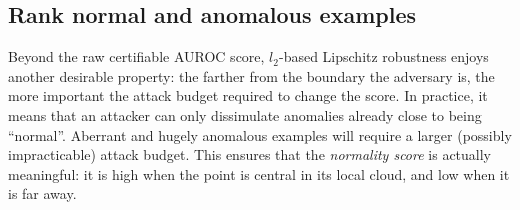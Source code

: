 \subsection{Rank normal and anomalous examples}
  
Beyond the raw certifiable AUROC score, $l_2$-based Lipschitz robustness enjoys another desirable property: the farther from the boundary the adversary is, the more important the attack budget required to change the score. In practice, it means that an attacker can only dissimulate anomalies already close to being ``normal''. Aberrant and hugely anomalous examples will require a larger (possibly impracticable) attack budget. This ensures that the \textit{normality score} is actually meaningful: it is high when the point is central in its local cloud, and low when it is far away.
